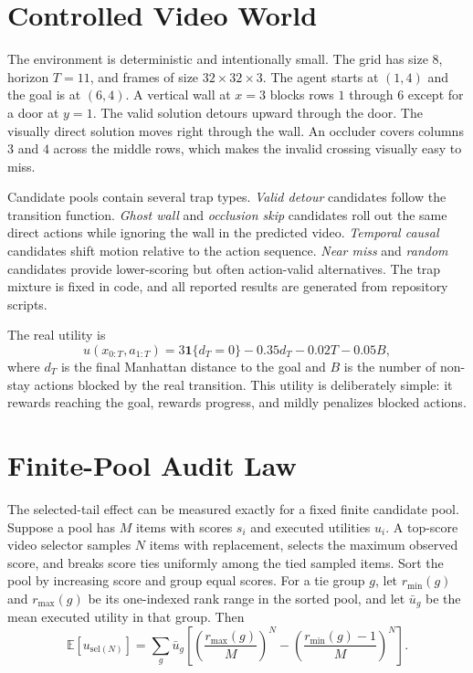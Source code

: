 \documentclass{article}
\newcommand{\score}{s}
\newcommand{\utility}{u}
\newcommand{\selected}{\mathrm{sel}}
\begin{document}
\section{Controlled Video World}

The environment is deterministic and intentionally small. The grid has size \(8\), horizon \(T=11\), and frames of size \(32 \times 32 \times 3\). The agent starts at \((1,4)\) and the goal is at \((6,4)\). A vertical wall at \(x=3\) blocks rows \(1\) through \(6\) except for a door at \(y=1\). The valid solution detours upward through the door. The visually direct solution moves right through the wall. An occluder covers columns \(3\) and \(4\) across the middle rows, which makes the invalid crossing visually easy to miss.

Candidate pools contain several trap types. \emph{Valid detour} candidates follow the transition function. \emph{Ghost wall} and \emph{occlusion skip} candidates roll out the same direct actions while ignoring the wall in the predicted video. \emph{Temporal causal} candidates shift motion relative to the action sequence. \emph{Near miss} and \emph{random} candidates provide lower-scoring but often action-valid alternatives. The trap mixture is fixed in code, and all reported results are generated from repository scripts.

The real utility is
\begin{equation}
  u(x_{0:T},a_{1:T}) =
  3\mathbf{1}\{d_T=0\} - 0.35 d_T - 0.02T - 0.05 B,
  \label{eq:utility}
\end{equation}
where \(d_T\) is the final Manhattan distance to the goal and \(B\) is the number of non-stay actions blocked by the real transition. This utility is deliberately simple: it rewards reaching the goal, rewards progress, and mildly penalizes blocked actions.

\section{Finite-Pool Audit Law}

The selected-tail effect can be measured exactly for a fixed finite candidate pool. Suppose a pool has \(M\) items with scores \(\score_i\) and executed utilities \(\utility_i\). A top-score video selector samples \(N\) items with replacement, selects the maximum observed score, and breaks score ties uniformly among the tied sampled items. Sort the pool by increasing score and group equal scores. For a tie group \(g\), let \(r_{\min}(g)\) and \(r_{\max}(g)\) be its one-indexed rank range in the sorted pool, and let \(\bar{u}_g\) be the mean executed utility in that group. Then
\begin{equation}
  \mathbb{E}[\utility_{\selected(N)}]
  =
  \sum_g
  \bar{u}_g
  \left[
    \left(\frac{r_{\max}(g)}{M}\right)^N
    -
    \left(\frac{r_{\min}(g)-1}{M}\right)^N
  \right].
  \label{eq:finite-law}
\end{equation}
\end{document}
